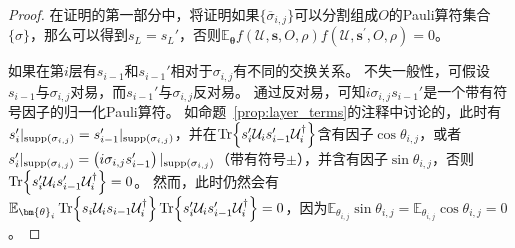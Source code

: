 \begin{lemma}
\begin{proof}
    在证明的第一部分中，将证明如果$\{\overline{\sigma}_{i,j}\}$可以分割组成$O$的Pauli算符集合$\{\sigma\}$，那么可以得到$s_L= s_L'$，否则$\mathbb{E}_{\bm{\theta}}f(\mathcal{U},\bm{s},O,\rho)f(\mathcal{U},\bm{s^{\prime}},O,\rho)=0$。
    
    如果在第$i$层有$s_{i-1}$和$s_{i-1}'$相对于$\sigma_{i,j}$有不同的交换关系。 
    不失一般性，可假设$s_{i-1}$与$\sigma_{i,j}$对易，而$s_{i-1}'$与$\sigma_{i,j}$反对易。 
    通过反对易，可知$i \sigma_{i,j} s_{i-1}'$是一个带有符号因子的归一化Pauli算符。 
    如命题~\ref{prop:layer_terms}的注释中讨论的，此时有$s_{i}'|_{{\text{supp} \left( \sigma_{i,j} \right)}}=s_{i-1}'|_{{\text{supp} \left( \sigma_{i,j} \right)}}$，并在$\Tr{s'_i\mathcal{U}_i s'_{i-1}\mathcal{U}_i^\dagger}$含有因子$\cos{\theta_{i,j}}$，或者$s_{i}'|_{{\text{supp} \left( \sigma_{i,j} \right)}}=\left(i\sigma_{i,j} s_{i-1}'\right)|_{{\text{supp} \left( \sigma_{i,j} \right)}}$（带有符号$\pm$），并含有因子$\sin{\theta_{i,j}}$，否则$\Tr{s'_i\mathcal{U}_i s'_{i-1}\mathcal{U}_i^\dagger}=0$。 
    然而，此时仍然会有$\mathbb{E}_{\bm{\theta}_i}\Tr{s_i\mathcal{U}_i s_{i-1}\mathcal{U}_i^\dagger}\Tr{s'_i\mathcal{U}_i s'_{i-1}\mathcal{U}_i^\dagger}=0$，因为$\mathbb{E}_{\theta_{i,j}} \sin{\theta_{i,j}}=\mathbb{E}_{\theta_{i,j}} \cos{\theta_{i,j}}=0$。
    

\end{proof}
\end{lemma}
